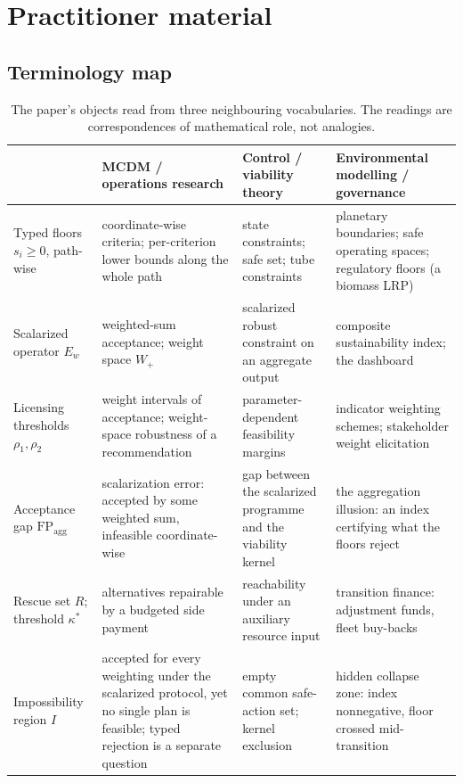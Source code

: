 \documentclass[preprint,11pt,authoryear]{elsarticle}
\theoremstyle{remark}
\newcommand{\Wp}{W_+}
\newcommand{\FP}{\mathrm{FP}_{\mathrm{agg}}}
\begin{document}
\section{Practitioner material}\label{si:practice}

\subsection{Terminology map}

\begin{table}[!htbp]
\centering\small
\caption{The paper's objects read from three neighbouring vocabularies. The readings are correspondences of mathematical role, not analogies.}
\label{tab:translation}
\begin{tabularx}{\textwidth}{@{}>{\raggedright\arraybackslash}p{}>{\raggedright\arraybackslash}X>{\raggedright\arraybackslash}X>{\raggedright\arraybackslash}X@{}}
\toprule
 & MCDM / operations research & Control / viability theory & Environmental modelling / governance \\
\midrule
Typed floors $s_i\ge0$, path-wise & coordinate-wise criteria; per-criterion lower bounds along the whole path & state constraints; safe set; tube constraints & planetary boundaries; safe operating spaces; regulatory floors (a biomass LRP) \\
\addlinespace
Scalarized operator $E_w$ & weighted-sum acceptance; weight space $\Wp$ & scalarized robust constraint on an aggregate output & composite sustainability index; the dashboard \\
\addlinespace
Licensing thresholds $\rho_1,\rho_2$ & weight intervals of acceptance; weight-space robustness of a recommendation & parameter-dependent feasibility margins & indicator weighting schemes; stakeholder weight elicitation \\
\addlinespace
Acceptance gap $\FP$ & scalarization error: accepted by some weighted sum, infeasible coordinate-wise & gap between the scalarized programme and the viability kernel & the aggregation illusion: an index certifying what the floors reject \\
\addlinespace
Rescue set $R$; threshold $\kappa^*$ & alternatives repairable by a budgeted side payment & reachability under an auxiliary resource input & transition finance: adjustment funds, fleet buy-backs \\
\addlinespace
Impossibility region $I$ & accepted for every weighting under the scalarized protocol, yet no single plan is feasible; typed rejection is a separate question & empty common safe-action set; kernel exclusion & hidden collapse zone: index nonnegative, floor crossed mid-transition \\

\end{tabularx}
\end{table}
\end{document}
